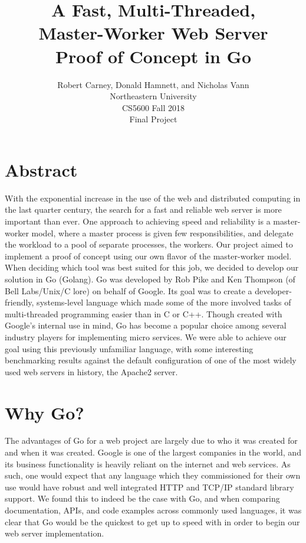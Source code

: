 \documentclass[10pt]{article}
\begin{document}
\title{
  A Fast, Multi-Threaded, \\
  Master-Worker Web Server \\
  \Large Proof of Concept in Go
}
  
\author{
  Robert Carney, Donald Hamnett, and Nicholas Vann \\
  Northeastern University \\
  CS5600 Fall 2018 \\
  Final Project 
}
\maketitle

\section*{Abstract}
\begin{multicols}{2}

\par
With the exponential increase in the use of the web and distributed computing in the last quarter century, the search for a fast and reliable web server is more important than ever.  One approach to achieving speed and reliability is a master-worker model, where a master process is given few responsibilities, and delegate the workload to a pool of separate processes, the workers.  Our project aimed to implement a proof of concept using our own flavor of the master-worker model.  When deciding which tool was best suited for this job, we decided to develop our solution in Go (Golang). Go was developed by Rob Pike and Ken Thompson (of Bell Labs/Unix/C lore) on behalf of Google.  Its goal was to create a developer-friendly, systems-level language which made some of the more involved tasks of multi-threaded programming easier than in C or C++.  Though created with Google's internal use in mind, Go has become a popular choice among several industry players for implementing micro services. We were able to achieve our goal using this previously unfamiliar language, with some interesting benchmarking results against the default configuration of one of the most widely used web servers in history, the Apache2 server.
\section*{Why Go?}
The advantages of Go for a web project are largely due to who it was created for and when it was created.  Google is one of the largest companies in the world, and its business functionality is heavily reliant on the internet and web services.  As such, one would expect that any language which they commissioned for their own use would have robust and well integrated HTTP and TCP/IP standard library support.  We found this to indeed be the case with Go, and when comparing documentation, APIs, and code examples across commonly used languages, it was clear that Go would be the quickest to get up to speed with in order to begin our web server implementation.  
\end{multicols}
\end{document}
